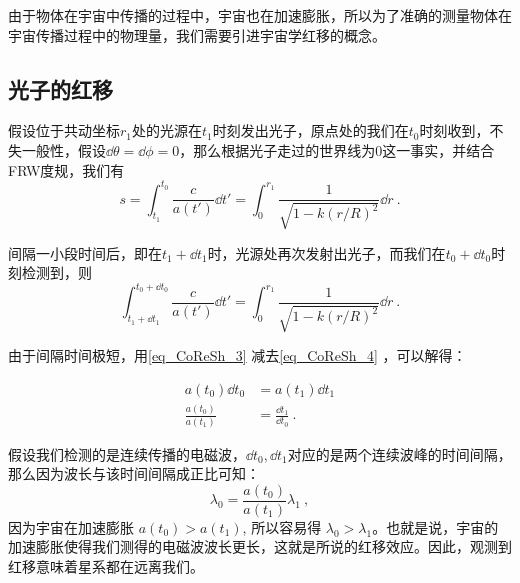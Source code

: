 \begin{issues}
\issueMissDepend
\end{issues}

由于物体在宇宙中传播的过程中，宇宙也在加速膨胀，所以为了准确的测量物体在宇宙传播过程中的物理量，我们需要引进宇宙学红移的概念。

\subsection{光子的红移}
假设位于共动坐标$r_1$处的光源在$t_1$时刻发出光子，原点处的我们在$t_0$时刻收到，不失一般性，假设$\dd\theta=\dd\phi=0$，那么根据光子走过的世界线为$0$这一事实，并结合FRW度规，我们有
\begin{equation}\label{eq_CoReSh_4}
s=\int^{t_0}_{t_1}\frac{c}{a(t')}\dd t'=\int_0^{r_1}\frac{1}{\sqrt{1-k(r/R)^2}}\dd r~.
\end{equation}

间隔一小段时间后，即在$t_1+\dd t_1$时，光源处再次发射出光子，而我们在$t_0+\dd t_0$时刻检测到，则
\begin{equation}\label{eq_CoReSh_3}
\int^{t_0+\dd t_0}_{t_1+\dd t_1}\frac{c}{a(t')}\dd t'=\int_0^{r_1}\frac{1}{\sqrt{1-k(r/R)^2}}\dd r~.
\end{equation}

由于间隔时间极短，用\autoref{eq_CoReSh_3} 减去\autoref{eq_CoReSh_4} ，可以解得：

\begin{equation}
\begin{aligned}
a(t_0)\dd t_0&=a(t_1)\dd t_1\\
\frac{a(t_0)}{a(t_1)}&=\frac{\dd t_1}{\dd t_0}~.
\end{aligned}
\end{equation}

假设我们检测的是连续传播的电磁波，$\dd t_0,\dd t_1$对应的是两个连续波峰的时间间隔，那么因为波长与该时间间隔成正比可知：
\begin{equation}\label{eq_CoReSh_1}
\lambda_0=\frac{a(t_0)}{a(t_1)}\lambda_1~,
\end{equation}
因为宇宙在加速膨胀 $a(t_0)>a(t_1)$, 所以容易得 $\lambda_0>\lambda_1$。也就是说，宇宙的加速膨胀使得我们测得的电磁波波长更长，这就是所说的红移效应。因此，观测到红移意味着星系都在远离我们。


